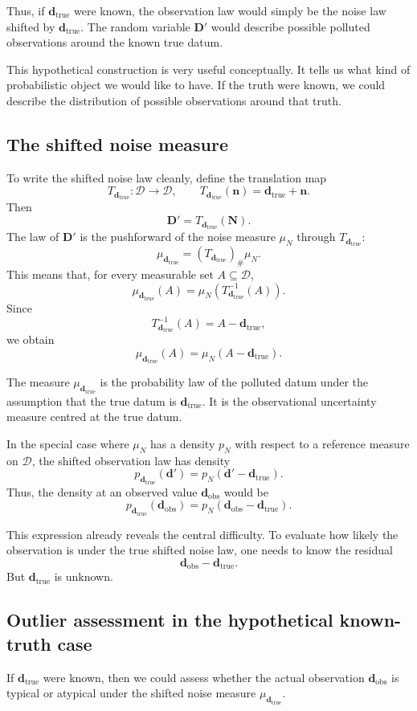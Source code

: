 \documentclass[11pt]{article}
\newcommand{\Dspace}{\mathcal D}
\newcommand{\muN}{\mu_N}
\newcommand{\Dobsrand}{\mathbf D'}
\newcommand{\Nrand}{\mathbf N}
\newcommand{\dtrue}{\mathbf d_{\mathrm{true}}}
\newcommand{\dobs}{\mathbf d_{\mathrm{obs}}}
\begin{document}
Thus, if \(\dtrue\) were known, the observation law would simply be the noise law shifted by \(\dtrue\). The random variable \(\Dobsrand\) would describe possible polluted observations around the known true datum.

This hypothetical construction is very useful conceptually. It tells us what kind of probabilistic object we would like to have. If the truth were known, we could describe the distribution of possible observations around that truth.

\subsection{The shifted noise measure}

To write the shifted noise law cleanly, define the translation map
\[
    T_{\dtrue}:\Dspace\to\Dspace,
    \qquad
    T_{\dtrue}(\mathbf n)=\dtrue+\mathbf n.
\]
Then
\[
    \Dobsrand=T_{\dtrue}(\Nrand).
\]
The law of \(\Dobsrand\) is the pushforward of the noise measure \(\muN\) through \(T_{\dtrue}\):
\[
    \mu_{\dtrue}
    =
    (T_{\dtrue})_{\#}\muN.
\]
This means that, for every measurable set \(A\subseteq\Dspace\),
\[
    \mu_{\dtrue}(A)
    =
    \muN\!\left(T_{\dtrue}^{-1}(A)\right).
\]
Since
\[
    T_{\dtrue}^{-1}(A)
    =
    A-\dtrue,
\]
we obtain
\[
    \mu_{\dtrue}(A)
    =
    \muN(A-\dtrue).
\]

The measure \(\mu_{\dtrue}\) is the probability law of the polluted datum under the assumption that the true datum is \(\dtrue\). It is the observational uncertainty measure centred at the true datum.

In the special case where \(\muN\) has a density \(p_N\) with respect to a reference measure on \(\Dspace\), the shifted observation law has density
\[
    p_{\dtrue}(\mathbf d')
    =
    p_N(\mathbf d'-\dtrue).
\]
Thus, the density at an observed value \(\dobs\) would be
\[
    p_{\dtrue}(\dobs)
    =
    p_N(\dobs-\dtrue).
\]

This expression already reveals the central difficulty. To evaluate how likely the observation is under the true shifted noise law, one needs to know the residual
\[
    \dobs-\dtrue.
\]
But \(\dtrue\) is unknown.

\subsection{Outlier assessment in the hypothetical known-truth case}

If \(\dtrue\) were known, then we could assess whether the actual observation \(\dobs\) is typical or atypical under the shifted noise measure \(\mu_{\dtrue}\).
\end{document}
